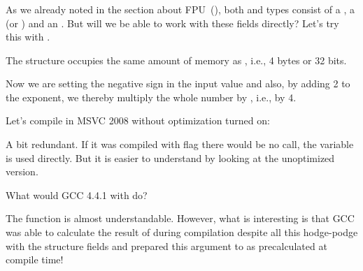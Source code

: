 \subsubsection{\WorkingWithFloatAsWithStructSubSubSectionName}
\label{sec:floatasstruct}

As we already noted in the section about FPU~(), 
both \Tfloat and \Tdouble types consist of a , 
a  (or ) and an .
But will we be able to work with these fields directly? Let's try this with \Tfloat.





The  structure occupies the same amount of  memory as \Tfloat, i.e., 4 bytes or 32 bits.

Now we are setting the negative sign in the input value and also, by adding 2 to the exponent, 
we thereby multiply the whole number by , i.e., by 4.

Let's compile in MSVC 2008 without optimization turned on:



A bit redundant.
If it was compiled with \Ox flag there would be no  call,
the  variable is used directly.
But it is easier to understand by looking at the unoptimized version.

What would GCC 4.4.1 with \Othree do?



The \ttf function is almost understandable. However, what is interesting is that GCC was able to calculate
the result of  during compilation despite all this hodge-podge with the structure fields
and prepared this argument to \printf{} as precalculated at compile time!
